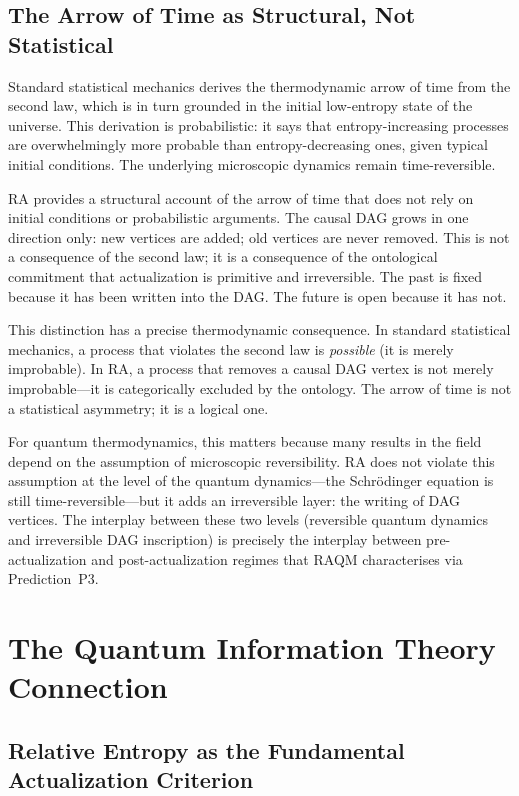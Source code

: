 \documentclass[11pt,a4paper]{article}
\theoremstyle{plain}
\theoremstyle{definition}
\theoremstyle{remark}
\begin{document}
\subsection{The Arrow of Time as Structural, Not Statistical}

Standard statistical mechanics derives the thermodynamic arrow of time from the
second law, which is in turn grounded in the initial low-entropy state of the
universe. This derivation is probabilistic: it says that entropy-increasing
processes are overwhelmingly more probable than entropy-decreasing ones, given
typical initial conditions. The underlying microscopic dynamics remain
time-reversible.

RA provides a structural account of the arrow of time that does not rely on
initial conditions or probabilistic arguments. The causal DAG grows in one
direction only: new vertices are added; old vertices are never removed. This is
not a consequence of the second law; it is a consequence of the ontological
commitment that actualization is primitive and irreversible. The past is fixed
because it has been written into the DAG. The future is open because it has not.

This distinction has a precise thermodynamic consequence. In standard statistical
mechanics, a process that violates the second law is \emph{possible} (it is merely
improbable). In RA, a process that removes a causal DAG vertex is not merely
improbable---it is categorically excluded by the ontology. The arrow of time is not
a statistical asymmetry; it is a logical one.

For quantum thermodynamics, this matters because many results in the field depend
on the assumption of microscopic reversibility. RA does not violate this
assumption at the level of the quantum dynamics---the Schr\"{o}dinger equation is
still time-reversible---but it adds an irreversible layer: the writing of DAG
vertices. The interplay between these two levels (reversible quantum dynamics and
irreversible DAG inscription) is precisely the interplay between pre-actualization
and post-actualization regimes that RAQM characterises via Prediction~P3.

\section{The Quantum Information Theory Connection}
\label{sec:qit}

\subsection{Relative Entropy as the Fundamental Actualization Criterion}
\end{document}
